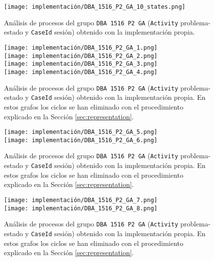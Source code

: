 \begin{figure}[H]
    \centering
    \texttt{[image: implementación/DBA\_1516\_P2\_GA\_10\_states.png]}
    \caption{Análisis de procesos del grupo \texttt{DBA 1516 P2 GA} (\texttt{Activity} problema-estado y \texttt{CaseId} sesión) obtenido con la implementación propia.}
    \label{fig:DBA1516P2GA3}
\end{figure}

\begin{figure}[H]
\centering
\texttt{[image: implementación/DBA\_1516\_P2\_GA\_1.png]} \\
\texttt{[image: implementación/DBA\_1516\_P2\_GA\_2.png]} \\
\texttt{[image: implementación/DBA\_1516\_P2\_GA\_3.png]} \\
\texttt{[image: implementación/DBA\_1516\_P2\_GA\_4.png]}
\caption{Análisis de procesos del grupo \texttt{DBA 1516 P2 GA} (\texttt{Activity} problema-estado y \texttt{CaseId} sesión) obtenido con la implementación propia. En estos grafos los ciclos se han eliminado con el procedimiento explicado en la Sección \ref{sec:representation}.}
\label{fig:DBA1516P2GA4}
\end{figure}

\begin{figure}[H]
\centering
\texttt{[image: implementación/DBA\_1516\_P2\_GA\_5.png]} \\
\texttt{[image: implementación/DBA\_1516\_P2\_GA\_6.png]}
\caption{Análisis de procesos del grupo \texttt{DBA 1516 P2 GA} (\texttt{Activity} problema-estado y \texttt{CaseId} sesión) obtenido con la implementación propia. En estos grafos los ciclos se han eliminado con el procedimiento explicado en la Sección \ref{sec:representation}.}
\label{fig:DBA1516P2GA5}
\end{figure}

\begin{figure}[H]
\centering
\texttt{[image: implementación/DBA\_1516\_P2\_GA\_7.png]} \\
\texttt{[image: implementación/DBA\_1516\_P2\_GA\_8.png]}
\caption{Análisis de procesos del grupo \texttt{DBA 1516 P2 GA} (\texttt{Activity} problema-estado y \texttt{CaseId} sesión) obtenido con la implementación propia. En estos grafos los ciclos se han eliminado con el procedimiento explicado en la Sección \ref{sec:representation}.}
\label{fig:DBA1516P2GA6}
\end{figure}

